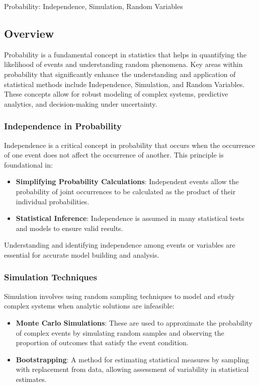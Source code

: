 \begin{notes}{Probability: Independence, Simulation, Random Variables}
    \subsection*{Overview}

    Probability is a fundamental concept in statistics that helps in quantifying the likelihood of events and understanding random phenomena. Key areas within probability that significantly enhance 
    the understanding and application of statistical methods include Independence, Simulation, and Random Variables. These concepts allow for robust modeling of complex systems, predictive analytics, 
    and decision-making under uncertainty. \vspace*{1em}
    
    \subsubsection*{Independence in Probability}
    
    Independence is a critical concept in probability that occurs when the occurrence of one event does not affect the occurrence of another. This principle is foundational in:
    \begin{itemize}
        \item \textbf{Simplifying Probability Calculations}: Independent events allow the probability of joint occurrences to be calculated as the product of their individual probabilities.
        \item \textbf{Statistical Inference}: Independence is assumed in many statistical tests and models to ensure valid results.
    \end{itemize}
    
    Understanding and identifying independence among events or variables are essential for accurate model building and analysis.
    
    \subsubsection*{Simulation Techniques}
    
    Simulation involves using random sampling techniques to model and study complex systems when analytic solutions are infeasible:
    \begin{itemize}
        \item \textbf{Monte Carlo Simulations}: These are used to approximate the probability of complex events by simulating random samples and observing the proportion of outcomes that satisfy the event condition.
        \item \textbf{Bootstrapping}: A method for estimating statistical measures by sampling with replacement from data, allowing assessment of variability in statistical estimates.
    \end{itemize}
    

\end{notes}
